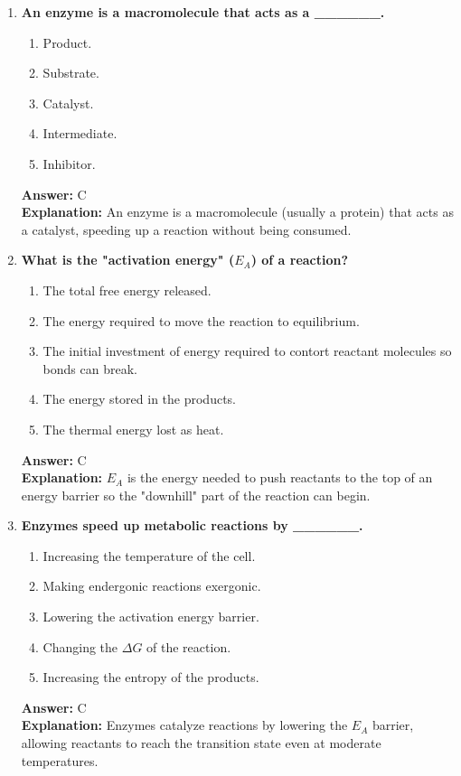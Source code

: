 \documentclass[11pt, a4paper]{article}
\begin{document}
\begin{enumerate}[leftmargin=*, label=\arabic*.]
\item \textbf{An enzyme is a macromolecule that acts as a \_\_\_\_\_\_.}
\begin{enumerate}[label=\Alph*.]
    \item Product.
    \item Substrate.
    \item Catalyst.
    \item Intermediate.
    \item Inhibitor.
\end{enumerate}
\textbf{Answer:} C \\
\textbf{Explanation:} An enzyme is a macromolecule (usually a protein) that acts as a catalyst, speeding up a reaction without being consumed.

\item \textbf{What is the "activation energy" ($E_A$) of a reaction?}
\begin{enumerate}[label=\Alph*.]
    \item The total free energy released.
    \item The energy required to move the reaction to equilibrium.
    \item The initial investment of energy required to contort reactant molecules so bonds can break.
    \item The energy stored in the products.
    \item The thermal energy lost as heat.
\end{enumerate}
\textbf{Answer:} C \\
\textbf{Explanation:} $E_A$ is the energy needed to push reactants to the top of an energy barrier so the "downhill" part of the reaction can begin.

\item \textbf{Enzymes speed up metabolic reactions by \_\_\_\_\_\_.}
\begin{enumerate}[label=\Alph*.]
    \item Increasing the temperature of the cell.
    \item Making endergonic reactions exergonic.
    \item Lowering the activation energy barrier.
    \item Changing the $\Delta G$ of the reaction.
    \item Increasing the entropy of the products.
\end{enumerate}
\textbf{Answer:} C \\
\textbf{Explanation:} Enzymes catalyze reactions by lowering the $E_A$ barrier, allowing reactants to reach the transition state even at moderate temperatures.


\end{enumerate}
\end{document}
